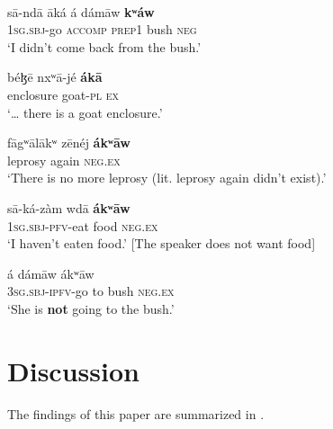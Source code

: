 \documentclass[output=paper,draft,draftmode,colorlinks,citecolor=brown]{langscibook}
\begin{document}
\newpage
\ea\label{ex:buwal-bush-goat-leprosy-food-she.bush}
\\

\ea\label{ex:buwal-bush}

\gll s\=a-nd\=a \=aká á dám\=aw \textbf{kʷáw}\\
1\textsc{sg.sbj}-go \textsc{accomp} \textsc{prep1} bush \textsc{neg}\\

\glt `I didn't come back from the bush.'
\ex\label{ex:buwal-goat}

\gll béɮ\=e nxʷ\=a-jé \textbf{ák\=a}\\
enclosure goat-\textsc{pl} \textsc{ex}\\

\glt `\ldots{} there is a goat enclosure.'
\ex\label{ex:buwal-leprosy}

\gll f\=agʷ\=al\=akʷ z\=enéj \textbf{ákʷ\=aw}\\
leprosy again \textsc{neg.ex}\\

\glt `There is no more leprosy (lit. leprosy again didn't exist).'
\ex\label{ex:buwal-food}

\gll s\=a-ká-zàm wd\=a \textbf{ákʷ\=aw}\\
1\textsc{sg.sbj-pfv}-eat food \textsc{neg.ex}\\

\glt `I haven't eaten food.' [The speaker does not want food]
\ex\label{ex:buwal-she.bush}

 {á} {dám\=aw} {ákʷ\=aw}%
\\
3\textsc{sg.sbj-ipfv}-go to bush \textsc{neg.ex}\\

\glt `She is \textbf{not} going to the bush.'

\z
\z


\section{Discussion}\label{sec:3:5}

The findings of this paper are summarized in . 
\end{document}
